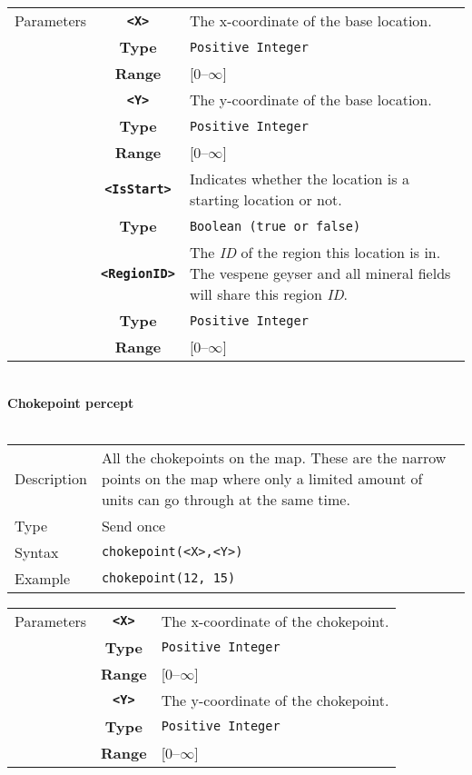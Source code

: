  \begin{tabularx}{\textwidth}{l | c | p{8cm}|}
 \cline{2-3} 
 Parameters & \textbf{\verb|<X>|} & The x-coordinate of the base location.\\
            & \textbf{Type} & \verb|Positive Integer| \\
            & \textbf{Range} & [0--$\infty$] \\
            \cline{2-3} 
            & \textbf{\verb|<Y>|} & The y-coordinate of the base location.\\
            & \textbf{Type} & \verb|Positive Integer| \\
            & \textbf{Range} & [0--$\infty$] \\
            \cline{2-3} 
            & \textbf{\verb|<IsStart>|} & Indicates whether the location is a starting location or not. \\
            & \textbf{Type} & \verb|Boolean (true or false)| \\
            \cline{2-3} 
            & \textbf{\verb|<RegionID>|} & The \textit{ID} of the region this location is in. The vespene geyser and all mineral fields will share this region \textit{ID}. \\
            & \textbf{Type} & \verb|Positive Integer| \\
            & \textbf{Range} & [0--$\infty$] \\
            \cline{2-3} 
\end{tabularx}\\
\newpage
\noindent
\textbf{Chokepoint percept}\\
\\
\begin{tabularx}{\textwidth}{lX}
 Description & All the chokepoints on the map. These are the narrow points on the map where only a limited amount of units can go through at the same time.  \\
 Type & Send once \\
 Syntax & \verb|chokepoint(<X>,<Y>)| \\
 Example & \verb|chokepoint(12, 15)| \\ 
 \end{tabularx}
 \begin{tabularx}{\textwidth}{l | c | p{8cm}|}
 \cline{2-3} 
 Parameters & \textbf{\verb|<X>|} & The x-coordinate of the chokepoint.\\
            & \textbf{Type} & \verb|Positive Integer| \\
            & \textbf{Range} & [0--$\infty$] \\
            \cline{2-3} 
            & \textbf{\verb|<Y>|} & The y-coordinate of the chokepoint.\\
            & \textbf{Type} & \verb|Positive Integer| \\
            & \textbf{Range} & [0--$\infty$] \\
            \cline{2-3} 
\end{tabularx}\\

